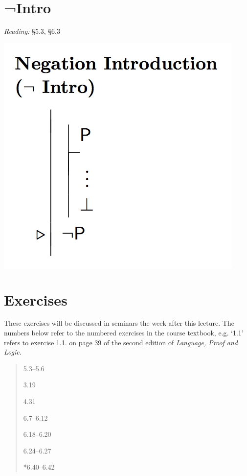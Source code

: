 \documentclass[12pt]{extarticle}
\begin{document}
\begin{multicols*}{3}
\begin{minipage}{\columnwidth}
\section{¬Intro}
 
\emph{Reading:} §5.3, §6.3
 
\begin{center}
\includegraphics[scale=0.3]{img/rule_negation_intro.png}
\end{center}
 \end{minipage}
 
 
\vfill
\begin{minipage}{\columnwidth}
\section{Exercises}
These exercises will be discussed in seminars the week after this lecture.
The numbers below refer to the numbered exercises in the course textbook, e.g. `1.1' refers to exercise 1.1. on page 39 of the second edition of \emph{Language, Proof and Logic}.
 
\begin{quote}
5.3--5.6
 
3.19
 
4.31
 
6.7--6.12
 
6.18--6.20
 
6.24--6.27
 
*6.40--6.42
 
\end{quote}
\end{minipage}



 

\end{multicols*}
\end{document}

